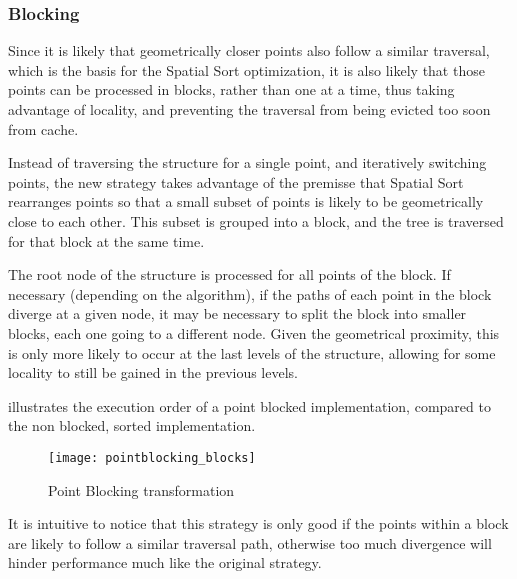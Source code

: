 \subsubsection{Blocking}
\label{sec:optim:block}


Since it is likely that geometrically closer points also follow a similar traversal, which is the basis for the Spatial Sort optimization, it is also likely that those points can be processed in blocks, rather than one at a time, thus taking advantage of locality, and preventing the traversal from being evicted too soon from cache.

Instead of traversing the structure for a single point, and iteratively switching points, the new strategy takes advantage of the premisse that Spatial Sort rearranges points so that a small subset of points is likely to be geometrically close to each other. This subset is grouped into a block, and the tree is traversed for that block at the same time.

The root node of the structure is processed for all points of the block. If necessary (depending on the algorithm), if the paths of each point in the block diverge at a given node, it may be necessary to split the block into smaller blocks, each one going to a different node. Given the geometrical proximity, this is only more likely to occur at the last levels of the structure, allowing for some locality to still be gained in the previous levels.

 illustrates the execution order of a point blocked implementation, compared to the non blocked, sorted implementation.

\begin{figure}[!htp]
	\centering
	\texttt{[image: pointblocking\_blocks]}
	\caption{Point Blocking transformation}
	\label{fig:sort}
\end{figure}

It is intuitive to notice that this strategy is only good if the points within a block are likely to follow a similar traversal path, otherwise too much divergence will hinder performance much like the original strategy.